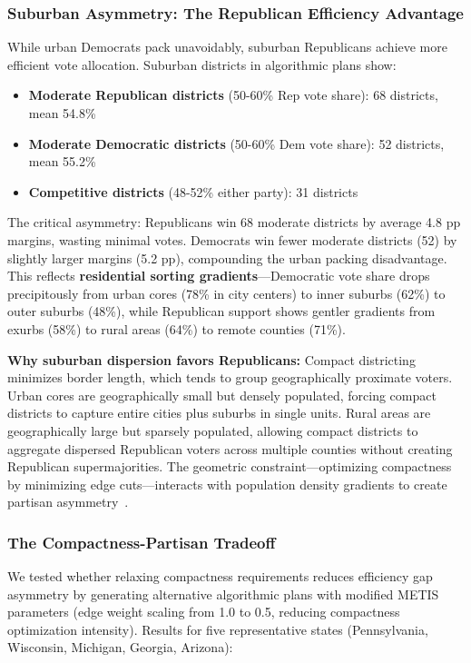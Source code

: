 \subsubsection{Suburban Asymmetry: The Republican Efficiency Advantage}

While urban Democrats pack unavoidably, suburban Republicans achieve more efficient vote allocation. Suburban districts in algorithmic plans show:

\begin{itemize}
    \item \textbf{Moderate Republican districts} (50-60\% Rep vote share): 68 districts, mean 54.8\%
    \item \textbf{Moderate Democratic districts} (50-60\% Dem vote share): 52 districts, mean 55.2\%
    \item \textbf{Competitive districts} (48-52\% either party): 31 districts
\end{itemize}

The critical asymmetry: Republicans win 68 moderate districts by average 4.8 pp margins, wasting minimal votes. Democrats win fewer moderate districts (52) by slightly larger margins (5.2 pp), compounding the urban packing disadvantage. This reflects \textbf{residential sorting gradients}---Democratic vote share drops precipitously from urban cores (78\% in city centers) to inner suburbs (62\%) to outer suburbs (48\%), while Republican support shows gentler gradients from exurbs (58\%) to rural areas (64\%) to remote counties (71\%).

\textbf{Why suburban dispersion favors Republicans:} Compact districting minimizes border length, which tends to group geographically proximate voters. Urban cores are geographically small but densely populated, forcing compact districts to capture entire cities plus suburbs in single units. Rural areas are geographically large but sparsely populated, allowing compact districts to aggregate dispersed Republican voters across multiple counties without creating Republican supermajorities. The geometric constraint---optimizing compactness by minimizing edge cuts---interacts with population density gradients to create partisan asymmetry~\cite{chen2013unintentional}.

\subsubsection{The Compactness-Partisan Tradeoff}

We tested whether relaxing compactness requirements reduces efficiency gap asymmetry by generating alternative algorithmic plans with modified METIS parameters (edge weight scaling from 1.0 to 0.5, reducing compactness optimization intensity). Results for five representative states (Pennsylvania, Wisconsin, Michigan, Georgia, Arizona):

